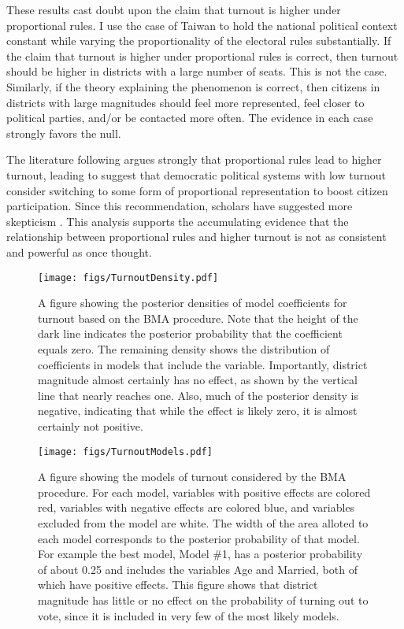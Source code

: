 \documentclass[12pt]{article}
\begin{document}
These results cast doubt upon the claim that turnout is higher under proportional rules. I use the case of Taiwan to hold the national political context constant while varying the proportionality of the electoral rules substantially. If the claim that turnout is higher under proportional rules is correct, then turnout should be higher in districts with a large number of seats. This is not the case. Similarly, if the theory explaining the phenomenon is correct, then citizens in districts with large magnitudes should feel more represented, feel closer to political parties, and/or be contacted more often. The evidence in each case strongly favors the null.

The literature following \cite{Powell1986} argues strongly that proportional rules lead to higher turnout, leading \cite{Lijphart1997} to suggest that democratic political systems with low turnout consider switching to some form of proportional representation to boost citizen participation. Since this recommendation, scholars have suggested more skepticism \citep{BlaisAarts2006}. This analysis supports the accumulating evidence that the relationship between proportional rules and higher turnout is not as consistent and powerful as once thought. 

\clearpage \singlespace \normalsize





\newpage
\begin{figure}[h]
\centering
\texttt{[image: figs/TurnoutDensity.pdf]}
\caption{A figure showing the posterior densities of model coefficients for turnout based on the BMA procedure. Note that the height of the dark line indicates the posterior probability that the coefficient equals zero. The remaining density shows the distribution of coefficients in models that include the variable. Importantly, district magnitude almost certainly has no effect, as shown by the vertical line that nearly reaches one. Also, much of the posterior density is negative, indicating that while the effect is likely zero, it is almost certainly not positive.}\label{fig:TurnoutDensity}
\end{figure}

\newpage
\begin{figure}[h]
\texttt{[image: figs/TurnoutModels.pdf]}
\caption{A figure showing the models of turnout considered by the BMA procedure. For each model, variables with positive effects are colored red, variables with negative effects are colored blue, and variables excluded from the model are white. The width of the area alloted to each model corresponds to the posterior probability of that model. For example the best model, Model \#1, has a posterior probability of about 0.25 and includes the variables Age and Married, both of which have positive effects. This figure shows that district magnitude has little or no effect on the probability of turning out to vote, since it is included in very few of the most likely models.}\label{fig:TurnoutModels}
\end{figure}
\end{document}
